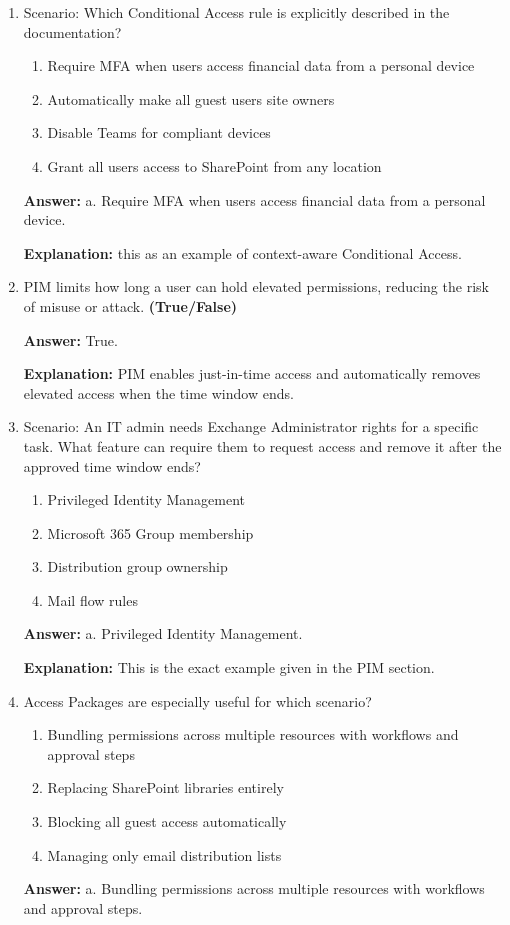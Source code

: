 \documentclass[10pt]{article}
\begin{document}
\begin{enumerate}[leftmargin=*]
\item Scenario: Which Conditional Access rule is explicitly described in the documentation?
\begin{enumerate}[label=\alph*., leftmargin=1.5em]
\item Require MFA when users access financial data from a personal device
\item Automatically make all guest users site owners
\item Disable Teams for compliant devices
\item Grant all users access to SharePoint from any location
\end{enumerate}
\textbf{Answer:} a. Require MFA when users access financial data from a personal device.

\textbf{Explanation:} this as an example of context-aware Conditional Access.

\item PIM limits how long a user can hold elevated permissions, reducing the risk of misuse or attack. \textbf{(True/False)}

\textbf{Answer:} True.

\textbf{Explanation:} PIM enables just-in-time access and automatically removes elevated access when the time window ends.

\item Scenario: An IT admin needs Exchange Administrator rights for a specific task. What feature can require them to request access and remove it after the approved time window ends?
\begin{enumerate}[label=\alph*., leftmargin=1.5em]
\item Privileged Identity Management
\item Microsoft 365 Group membership
\item Distribution group ownership
\item Mail flow rules
\end{enumerate}
\textbf{Answer:} a. Privileged Identity Management.

\textbf{Explanation:} This is the exact example given in the PIM section.

\item Access Packages are especially useful for which scenario?
\begin{enumerate}[label=\alph*., leftmargin=1.5em]
\item Bundling permissions across multiple resources with workflows and approval steps
\item Replacing SharePoint libraries entirely
\item Blocking all guest access automatically
\item Managing only email distribution lists
\end{enumerate}
\textbf{Answer:} a. Bundling permissions across multiple resources with workflows and approval steps.


\end{enumerate}
\end{document}
